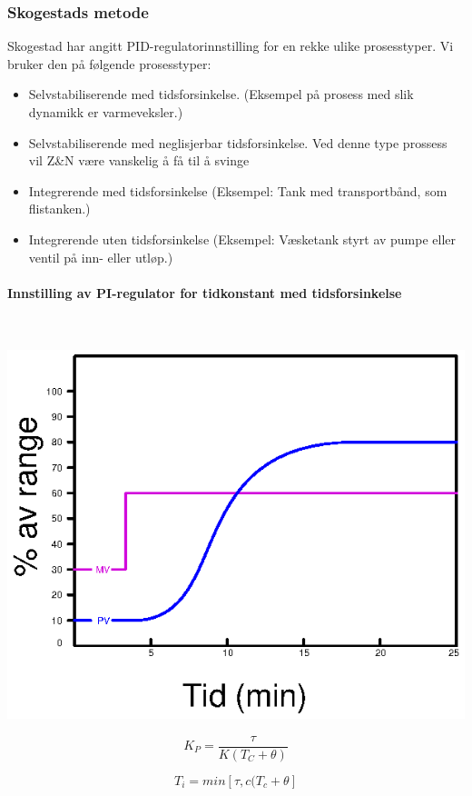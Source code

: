 \subsubsection{Skogestads metode}

Skogestad har angitt PID-regulatorinnstilling for en rekke ulike prosesstyper. Vi bruker den på følgende prosesstyper:
\begin{itemize}
\item Selvstabiliserende med tidsforsinkelse. (Eksempel på
prosess med slik dynamikk er varmeveksler.)
\item Selvstabiliserende med neglisjerbar tidsforsinkelse. Ved denne type prossess vil Z\&N være vanskelig å få til å svinge
\item Integrerende med tidsforsinkelse 
(Eksempel: Tank med transportbånd, som flistanken.)
\item Integrerende uten tidsforsinkelse (Eksempel: Væsketank styrt av pumpe eller ventil på inn- eller utløp.)
\end{itemize}

\paragraph{Innstilling av PI-regulator for tidkonstant med tidsforsinkelse}

~

\includegraphics{Sprang_selvregulerende.eps}

\[
K_{P}=\dfrac{\tau}{K\left(T_{C}+\theta\right)}
\]

\[
T_{i}=min[\tau,c(T_{c}+\theta]
\]

